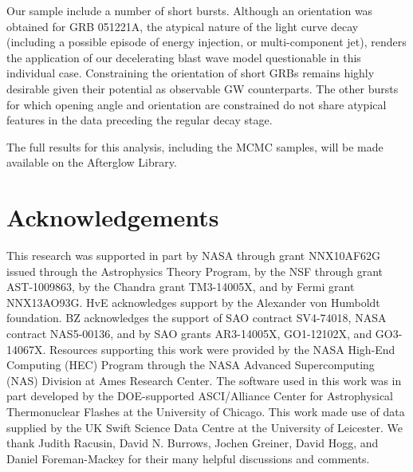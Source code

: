 Our sample include a number of short bursts. Although an orientation was obtained for GRB 051221A, the atypical nature of the light curve decay (including a  possible episode of energy injection, or multi-component jet), renders the application of our decelerating blast wave model questionable in this individual case. Constraining the orientation of short GRBs remains highly desirable given their potential as observable GW counterparts.  The other bursts for which opening angle and orientation are constrained do not share atypical features in the data preceding the regular decay stage.

The full results for this analysis, including the MCMC samples, will be made available on the Afterglow Library.


\section{Acknowledgements}

This research was supported in part by NASA through grant NNX10AF62G issued through the Astrophysics Theory Program, by the NSF through grant AST-1009863, by the Chandra grant TM3-14005X, and by Fermi grant NNX13AO93G.  HvE acknowledges support by the Alexander von Humboldt foundation.  BZ acknowledges the support of SAO contract SV4-74018, NASA contract NAS5-00136, and by SAO grants AR3-14005X, GO1-12102X, and GO3-14067X.  Resources supporting this work were provided by the NASA High-End Computing (HEC) Program through the NASA Advanced Supercomputing (NAS) Division at Ames Research Center. The software used in this work was in part developed by the DOE-supported ASCI/Alliance Center for Astrophysical Thermonuclear Flashes at the University of Chicago.  This work made use of data supplied by the UK Swift Science Data Centre at the University of Leicester.  We thank Judith Racusin, David N. Burrows, Jochen Greiner, David Hogg, and Daniel Foreman-Mackey for their many helpful discussions and comments.


%
